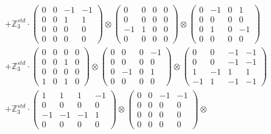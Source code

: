 \documentclass{article}
\begin{document}
{\begin{align}
        &+ \label{Rs16-Rc11-Solution-27-c22} \mathbb{Z}_3^{std} \cdot 
            \begin{pmatrix} 0 & 0 & -1 & -1 \\ 0 & 0 & 1 & 1 \\ 0 & 0 & 0 & 0 \\ 0 & 0 & 0 & 0 \end{pmatrix} \otimes 
            \begin{pmatrix} 0 & 0 & 0 & 0 \\ 0 & 0 & 0 & 0 \\ -1 & 1 & 0 & 0 \\ 0 & 0 & 0 & 0 \end{pmatrix} \otimes 
            \begin{pmatrix} 0 & -1 & 0 & 1 \\ 0 & 0 & 0 & 0 \\ 0 & 1 & 0 & -1 \\ 0 & 0 & 0 & 0 \end{pmatrix} \\ 
        &+ \label{Rs16-Rc11-Solution-27-c23} \mathbb{Z}_3^{std} \cdot 
            \begin{pmatrix} 0 & 0 & 0 & 0 \\ 0 & 0 & 1 & 0 \\ 0 & 0 & 0 & 0 \\ 1 & 0 & 1 & 0 \end{pmatrix} \otimes 
            \begin{pmatrix} 0 & 0 & 0 & -1 \\ 0 & 0 & 0 & 0 \\ 0 & -1 & 0 & 1 \\ 0 & 0 & 0 & 0 \end{pmatrix} \otimes 
            \begin{pmatrix} 0 & 0 & -1 & -1 \\ 0 & 0 & -1 & -1 \\ 1 & -1 & 1 & 1 \\ -1 & 1 & -1 & -1 \end{pmatrix} \\ 
        &+ \label{Rs16-Rc11-Solution-27-c24} \mathbb{Z}_3^{std} \cdot 
            \begin{pmatrix} 1 & 1 & 1 & -1 \\ 0 & 0 & 0 & 0 \\ -1 & -1 & -1 & 1 \\ 0 & 0 & 0 & 0 \end{pmatrix} \otimes 
            \begin{pmatrix} 0 & 0 & -1 & -1 \\ 0 & 0 & 0 & 0 \\ 0 & 0 & 0 & 0 \\ 0 & 0 & 0 & 0 \end{pmatrix} \otimes 

\end{align}}
\end{document}
